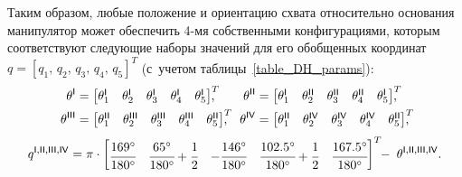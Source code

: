 Таким образом, любые положение и ориентацию схвата относительно основания манипулятор может обеспечить 4-мя собственными конфигурациями, которым соответствуют следующие наборы значений для его обобщенных координат $q=\left[q_1,\,q_2,\,q_3,\,q_4,\,q_5\right]^T$ (с~учетом таблицы~\ref{table_DH_params}):
\begin{align}
	\theta^\msf{I} &=
	\begin{bmatrix}
	    \theta_1^\msf{I} & \theta_2^\msf{I} & \theta_3^\msf{I} & \theta_4^\msf{I} & \theta_5^\msf{I}
	\end{bmatrix}^T\!\!\!\!\!,
	&
	\theta^\msf{II} &=
	\begin{bmatrix}
	    \theta_1^\msf{I} & \theta_2^\msf{II} & \theta_3^\msf{II} & \theta_4^\msf{II} & \theta_5^\msf{I}
	\end{bmatrix}^T\!\!\!\!\!,
	\\
	\theta^\msf{III} &=
	\begin{bmatrix}
	    \theta_1^\msf{II} & \theta_2^\msf{III} & \theta_3^\msf{III} & \theta_4^\msf{III} & \theta_5^\msf{II}
	\end{bmatrix}^T\!\!\!\!\!,
	&
	\theta^\msf{IV} &=
	\begin{bmatrix}
	    \theta_1^\msf{II} & \theta_2^\msf{IV} & \theta_3^\msf{IV} & \theta_4^\msf{IV} & \theta_5^\msf{II}
	\end{bmatrix}^T\!\!\!\!\!,
\end{align}
\begin{equation}
    q^{\mathsf{I,II,III,IV}} =
    \pi \cdot
    \begin{bmatrix}
	    \cfrac{169^\circ}{180^\circ} & \cfrac{65^\circ}{180^\circ} + \cfrac{1}{2} & -\cfrac{146^\circ}{180^\circ} &
	    \cfrac{102.5^\circ}{180^\circ} + \cfrac{1}{2} & \cfrac{167.5^\circ}{180^\circ}
	\end{bmatrix}^T
	\!\!- \; \theta^{\mathsf{I,II,III,IV}} \ldotp
\end{equation}
